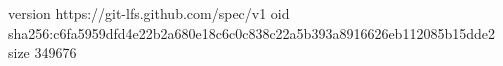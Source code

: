 version https://git-lfs.github.com/spec/v1
oid sha256:c6fa5959dfd4e22b2a680e18c6c0c838c22a5b393a8916626eb112085b15dde2
size 349676
